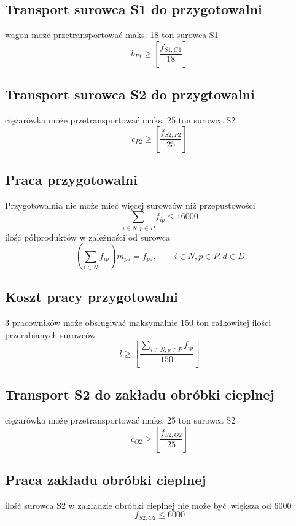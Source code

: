 \subsection{Transport surowca S1 do przygotowalni}
wagon może przetransportować maks. 18 ton surowca S1
\begin{equation}
b_{P1} \geq [\frac{ f_{S1, G1} }{18}]
\end{equation}
\subsection{Transport surowca S2 do przygtowalni}
ciężarówka może przetransportować maks. 25 ton surowca S2
\begin{equation}
c_{P2} \geq [ \frac{ f_{S2, P2} }{ 25 } ]
\end{equation}
\subsection{Praca przygotowalni}
Przygotowalnia nie może mieć więcej surowców niż przepustowości
\begin{equation}
\sum_{i \in N, p \in P} f_{ip} \leq 16000
\end{equation}
ilość półproduktów w zależności od surowca
\begin{equation}
(\sum_{i \in N} f_{ip}) m_{pd} = f_{pd}, \qquad i \in N, p \in P, d \in D
\end{equation}
\subsection{Koszt pracy przygotowalni}
3 pracowników może obsługiwać maksymalnie 150 ton całkowitej ilości przerabianych surowców
\begin{equation}
l \geq [ \frac{ \sum_{i\in N, p \in P} f_{ip} }{150} ]
\end{equation}
\subsection{Transport S2 do zakładu obróbki cieplnej}
ciężarówka może przetransportować maks. 25 ton surowca S2
\begin{equation}
c_{O2} \geq [\frac{ f_{S2, O2} }{25}]
\end{equation}
\subsection{Praca zakładu obróbki cieplnej}
ilość surowca S2 w zakładzie obróbki cieplnej nie może być większa od 6000
\begin{equation}
f_{S2, O2} \leq 6000
\end{equation}
